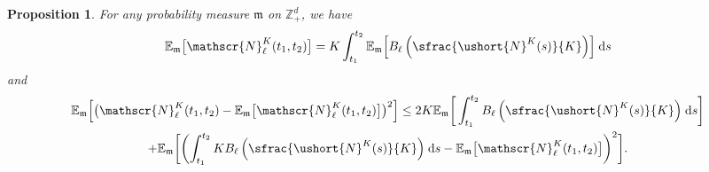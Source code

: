 \documentclass[JEP,XML,SOM,Unicode]{cedram}
\let\mathcal\mathscr
\numberwithin{equation}{section}
\theoremstyle{plain}
\newtheorem{proposition}[theorem]{Proposition}
\theoremstyle{definition}
\newcommand{\E}{{\mathbb{E}}}
\newcommand{\zentiers}{{\mathbb{Z}}}
\newcommand{\domaine}{\zentiers_{+}^{d}}
\newcommand{\sK}{K}
\newcommand{\leproc}{\ushort{N}^{K}}
\newcommand{\dd}{\hspace{1pt}\mathrm{d}}
\begin{document}
\begin{proposition}\label{prop-rentree}
For any probability measure $\mathfrak{m}$ on $\domaine$, we have
\[
\E_{\mathfrak{m}}\bigl[\mathcal{N}^{\sK}_\ell(t_{1},t_{2}) \bigr]=
K \int_{t_{1}}^{t_{2}} \E_{\mathfrak{m}}\!\left[B_{\ell}\left(\sfrac{\leproc(s)}{K}\right)\right] \dd s
\]
and
\begin{multline*}
\E_{\mathfrak{m}} \Bigl[\bigl(\mathcal{N}^{\sK}_\ell(t_{1},t_{2})
- \E_{\mathfrak{m}}\bigl[\mathcal{N}^{\sK}_\ell(t_{1},t_{2})\bigr] \bigr)^2 \Bigr]
\leq 2K\E_{\mathfrak{m}}\!\left[\,\int_{t_{1}}^{t_{2}} B_{\ell}\left(\sfrac{\leproc(s)}{K}\right) \dd s \right]\\
+ \E_{\mathfrak{m}} \biggl[\biggl(\int_{t_{1}}^{t_{2}} K B_{\ell}\left(\sfrac{\leproc(s)}{K}\right) \dd s
- \E_{\mathfrak{m}}\bigl[\mathcal{N}^{\sK}_\ell(t_{1},t_{2})\bigr] \biggr)^2\biggr].
\end{multline*}
\end{proposition}
\end{document}
